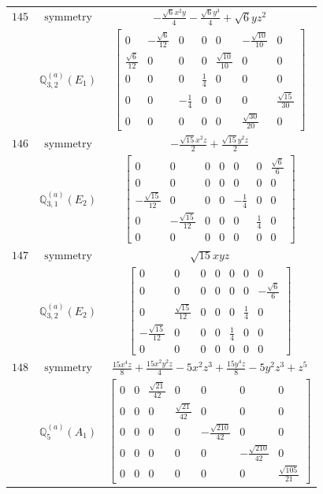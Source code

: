 \documentclass[fleqn,8pt,landscape]{jsarticle}
\begin{document}
\begin{longtable}{ccc}
$ 145 $ & $ \text{symmetry} $ & $ - \frac{\sqrt{6} x^{2} y}{4} - \frac{\sqrt{6} y^{3}}{4} + \sqrt{6} y z^{2} $ \\
$  $ & $ \mathbb{Q}_{3,2}^{(a)}(E_{1}) $ & $ \begin{bmatrix} 0 & - \frac{\sqrt{6}}{12} & 0 & 0 & 0 & - \frac{\sqrt{10}}{10} & 0 \\ \frac{\sqrt{6}}{12} & 0 & 0 & 0 & \frac{\sqrt{10}}{10} & 0 & 0 \\ 0 & 0 & 0 & \frac{1}{4} & 0 & 0 & 0 \\ 0 & 0 & - \frac{1}{4} & 0 & 0 & 0 & \frac{\sqrt{15}}{30} \\ 0 & 0 & 0 & 0 & 0 & \frac{\sqrt{30}}{20} & 0 \end{bmatrix} $ \\ \hline
$ 146 $ & $ \text{symmetry} $ & $ - \frac{\sqrt{15} x^{2} z}{2} + \frac{\sqrt{15} y^{2} z}{2} $ \\
$  $ & $ \mathbb{Q}_{3,1}^{(a)}(E_{2}) $ & $ \begin{bmatrix} 0 & 0 & 0 & 0 & 0 & 0 & \frac{\sqrt{6}}{6} \\ 0 & 0 & 0 & 0 & 0 & 0 & 0 \\ - \frac{\sqrt{15}}{12} & 0 & 0 & 0 & - \frac{1}{4} & 0 & 0 \\ 0 & - \frac{\sqrt{15}}{12} & 0 & 0 & 0 & \frac{1}{4} & 0 \\ 0 & 0 & 0 & 0 & 0 & 0 & 0 \end{bmatrix} $ \\ \hline
$ 147 $ & $ \text{symmetry} $ & $ \sqrt{15} x y z $ \\
$  $ & $ \mathbb{Q}_{3,2}^{(a)}(E_{2}) $ & $ \begin{bmatrix} 0 & 0 & 0 & 0 & 0 & 0 & 0 \\ 0 & 0 & 0 & 0 & 0 & 0 & - \frac{\sqrt{6}}{6} \\ 0 & \frac{\sqrt{15}}{12} & 0 & 0 & 0 & \frac{1}{4} & 0 \\ - \frac{\sqrt{15}}{12} & 0 & 0 & 0 & \frac{1}{4} & 0 & 0 \\ 0 & 0 & 0 & 0 & 0 & 0 & 0 \end{bmatrix} $ \\ \hline
$ 148 $ & $ \text{symmetry} $ & $ \frac{15 x^{4} z}{8} + \frac{15 x^{2} y^{2} z}{4} - 5 x^{2} z^{3} + \frac{15 y^{4} z}{8} - 5 y^{2} z^{3} + z^{5} $ \\
$  $ & $ \mathbb{Q}_{5}^{(a)}(A_{1}) $ & $ \begin{bmatrix} 0 & 0 & \frac{\sqrt{21}}{42} & 0 & 0 & 0 & 0 \\ 0 & 0 & 0 & \frac{\sqrt{21}}{42} & 0 & 0 & 0 \\ 0 & 0 & 0 & 0 & - \frac{\sqrt{210}}{42} & 0 & 0 \\ 0 & 0 & 0 & 0 & 0 & - \frac{\sqrt{210}}{42} & 0 \\ 0 & 0 & 0 & 0 & 0 & 0 & \frac{\sqrt{105}}{21} \end{bmatrix} $ \\ \hline

\end{longtable}
\end{document}
